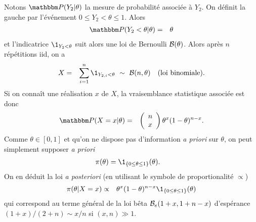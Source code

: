 \begin{rep} %
Notons $\Pp(Y_2|\theta)$ la mesure de probabilité associée à $Y_2$. On définit la gauche par l'événement $0\leq Y_2<\theta\leq 1$. Alors
\begin{eqnarray*}
\Pp(Y_2<\theta|\theta) & = & \theta
\end{eqnarray*}
et l'indicatrice $\1_{Y_2<\theta}$ suit alors une loi de Bernoulli ${\cal{B}}(\theta)$. Alors après $n$ répétitions iid, on a 
\begin{eqnarray*}
X & = & \sum\limits_{i=1}^n \1_{Y_{2,i}<\theta} \ \sim \ {\cal{B}}(n,\theta) \ \ \ \text{(loi binomiale)}.
\end{eqnarray*}
Si on connaît une réalisation $x$ de $X$, la vraisemblance statistique associée est donc
\begin{eqnarray*}
\Pp(X=x|\theta) & = & \left(\begin{array}{l} n \\ x \end{array}\right) \theta^x (1-\theta)^{n-x}.
\end{eqnarray*}
Comme $\theta\in[0,1]$ et qu'on ne dispose pas d'information {\it a priori} sur $\theta$, on peut simplement supposer {\it a priori}
\begin{eqnarray*}
\pi(\theta) & = \1_{\{0\leq \theta \leq 1\}}(\theta).
\end{eqnarray*}
 On en déduit la loi {\it a posteriori} (en utilisant le symbole de proportionalité $\propto$)
 \begin{eqnarray*}
 \pi(\theta|X=x) & \propto & \theta^x (1-\theta)^{n-x}\1_{\{0\leq \theta \leq 1\}}(\theta)
 \end{eqnarray*}
 qui correspond au terme général de la loi bêta ${\cal{B}}_e(1+x,1+n-x)$ d'espérance $(1+x)/(2+n)\sim x/n$ si $(x,n)\gg 1$.
 \end{rep}